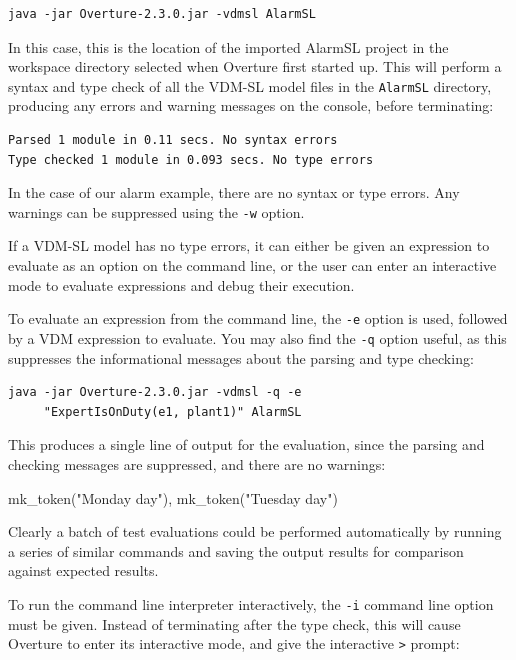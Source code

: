 \begin{lstlisting}
java -jar Overture-2.3.0.jar -vdmsl AlarmSL
\end{lstlisting}

\noindent In this case, this is the location of the imported AlarmSL project in the workspace directory selected when Overture first started up.  This will perform a syntax and type check of all the VDM-SL model files in the \texttt{AlarmSL} directory, producing any errors and warning messages on the console, before terminating:

\begin{lstlisting}[style=mystyle]
Parsed 1 module in 0.11 secs. No syntax errors
Type checked 1 module in 0.093 secs. No type errors
\end{lstlisting}

\noindent In the case of our alarm example, there are no syntax or type errors. Any warnings can be suppressed using the \verb|-w| option.

If a VDM-SL model has no type errors, it can either be given an expression to evaluate as an option on the command line, or the user can enter an interactive mode to evaluate expressions and debug their execution.

To evaluate an expression from the command line, the \verb|-e| option is used, followed by a VDM expression to evaluate. You may also find the \verb|-q| option useful, as this suppresses the informational messages about the parsing and type checking:

\begin{lstlisting}[style=tool]
java -jar Overture-2.3.0.jar -vdmsl -q -e 
     "ExpertIsOnDuty(e1, plant1)" AlarmSL
\end{lstlisting}

\noindent This produces a single line of output for the evaluation, since the parsing and checking messages are suppressed, and there are no warnings:

\begin{vdmsl}
{mk_token("Monday day"), mk_token("Tuesday day")}
\end{vdmsl}

Clearly a batch of test evaluations could be performed automatically by running a series of similar commands and saving the output results for comparison against expected results.

To run the command line interpreter interactively, the \verb|-i| command line option must be given. Instead of terminating after the type check, this will cause Overture to enter its interactive mode, and
give the interactive \verb|>| prompt:

